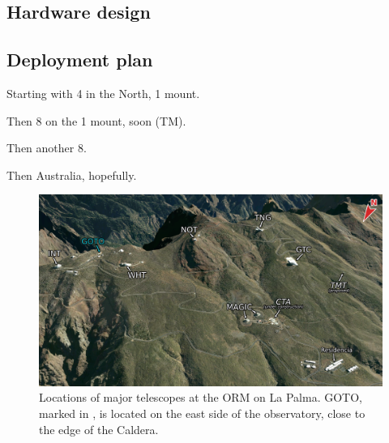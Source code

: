 \begin{colsection}
\begin{colsection}
\end{colsection}


\subsection{Hardware design}
\label{sec:goto_design}
\begin{colsection}


\end{colsection}


\newpage
\subsection{Deployment plan}
\label{sec:goto_expansion}
\begin{colsection}


Starting with 4 in the North, 1 mount.

Then 8 on the 1 mount, soon (TM).

Then another 8.

Then Australia, hopefully.

\newpage

\begin{figure}[p]
    \begin{center}
        \includegraphics[width=\linewidth]{images/orm_labelled.png}
    \end{center}
    \caption[Locations of major telescopes on La Palma]{
        Locations of major telescopes at the ORM on La Palma. GOTO, marked in , is located on the east side of the observatory, close to the edge of the Caldera.
    }\label{fig:orm}
\end{figure}


\end{colsection}
\end{colsection}
